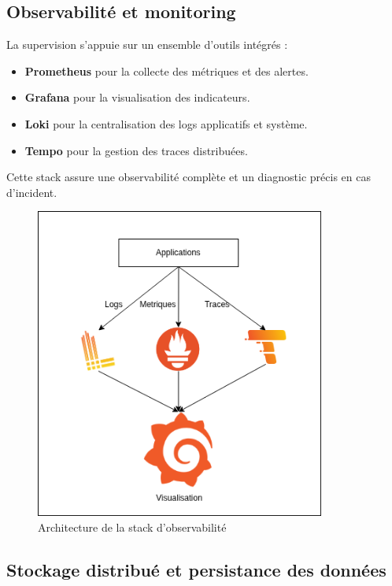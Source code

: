 \subsection{Observabilité et monitoring}

La supervision s'appuie sur un ensemble d’outils intégrés :

\begin{itemize}
	\item \textbf{Prometheus} pour la collecte des métriques et des alertes.
	\item \textbf{Grafana} pour la visualisation des indicateurs.
	\item \textbf{Loki} pour la centralisation des logs applicatifs et système.
	\item \textbf{Tempo} pour la gestion des traces distribuées.
\end{itemize}

Cette stack assure une observabilité complète et un diagnostic précis en cas d’incident.

\begin{figure}[H]
	\centering
	\includegraphics[width=0.85\textwidth]{figures/observabilite-stack.png}
	\caption{Architecture de la stack d'observabilité}
\end{figure}

\subsection{Stockage distribué et persistance des données}

